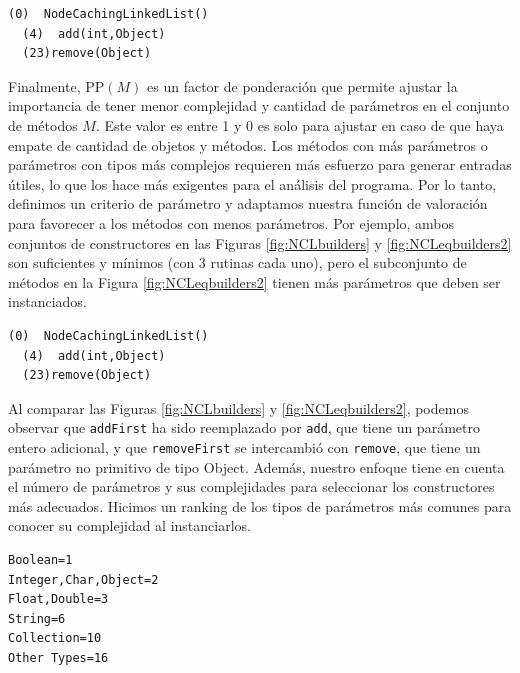 \begin{lstlisting}[label=fig:NCLeqbuilders2, caption=Sufficient and minimal builders for NCL with more complex parameters than the ones in Figure \ref{fig:NCLbuilders}, captionpos=b, frame=tb, float=t]
  (0)  NodeCachingLinkedList()
  (4)  add(int,Object)
  (23)remove(Object)
\end{lstlisting}

Finalmente, $\text{{PP}}(M)$ es un factor de ponderación que permite ajustar la importancia de tener menor complejidad y cantidad de parámetros en el conjunto de métodos $M$. Este valor es entre 1 y 0 es solo para ajustar en caso de que haya empate de cantidad de objetos y métodos.
Los métodos con más parámetros o parámetros con tipos más complejos requieren más esfuerzo para generar entradas útiles, lo que los hace más exigentes para el análisis del programa. Por lo tanto, definimos un criterio de parámetro y adaptamos nuestra función de valoración para favorecer a los métodos con menos parámetros. Por ejemplo, ambos conjuntos de constructores en las Figuras \ref{fig:NCLbuilders} y \ref{fig:NCLeqbuilders2} son suficientes y mínimos (con 3 rutinas cada uno), pero el subconjunto de métodos en la Figura \ref{fig:NCLeqbuilders2} tienen más parámetros que deben ser instanciados. 

\begin{lstlisting}[label=fig:NCLeqbuilders2, caption=Sufficient and minimal builders for NCL with more complex parameters than the ones in Figure \ref{fig:NCLbuilders}, captionpos=b, frame=tb, float=t]
  (0)  NodeCachingLinkedList()
  (4)  add(int,Object)
  (23)remove(Object)
\end{lstlisting}

Al comparar las Figuras \ref{fig:NCLbuilders} y \ref{fig:NCLeqbuilders2}, podemos observar que \texttt{addFirst} ha sido reemplazado por \texttt{add}, que tiene un parámetro entero adicional, y que \texttt{removeFirst} se intercambió con \texttt{remove}, que tiene un parámetro no primitivo de tipo Object. Además, nuestro enfoque tiene en cuenta el número de parámetros y sus complejidades para seleccionar los constructores más adecuados. Hicimos un ranking de los tipos de parámetros más comunes para conocer su complejidad al instanciarlos.

\begin{lstlisting}[label=fig:rankParameters, caption=Ranking con los tipos de parametros, captionpos=b, frame=tb, float=t]
Boolean=1
Integer,Char,Object=2
Float,Double=3
String=6
Collection=10
Other Types=16
\end{lstlisting}

